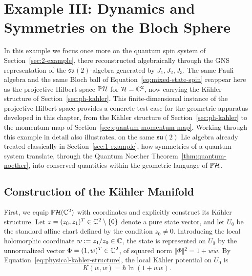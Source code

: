 \section{Example III: Dynamics and Symmetries on the Bloch Sphere}
\label{sec:ex-three}

In this example we focus once more on the quantum spin system of Section~\ref{sec:2-example}, there reconstructed algebraically through the GNS representation of the $\mathfrak{su}(2)$-algebra generated by $J_1,J_2,J_3$. The same Pauli algebra and the same Bloch ball of Equation~\eqref{eq:mixed-state-spin} reappear here as the projective Hilbert space $\PH$ for $\H=\C^2$, now carrying the Kähler structure of Section~\ref{sec:ph-kahler}.
This finite-dimensional instance of the projective Hilbert space provides a concrete test case for the geometric apparatus developed in this chapter, from the Kähler structure of Section~\ref{sec:ph-kahler} to the momentum map of Section~\ref{sec:quantum-momentum-map}. Working through this example in detail also illustrates, on the same $\mathfrak{su}(2)$ Lie algebra already treated classically in Section~\ref{sec:1-example}, how symmetries of a quantum system translate, through the Quantum Noether Theorem~\ref{thm:quantum-noether}, into conserved quantities within the geometric language of $\PH$.


\subsection*{Construction of the Kähler Manifold}

First, we equip $\PH(\C^2)$ with coordinates and explicitly construct its Kähler structure. Let $z = (z_0, z_1)^T \in \mathbb{C}^2 \setminus \{0\}$ denote a pure state vector, and let $U_0$ be the standard affine chart defined by the condition $z_0 \neq 0$. Introducing the local holomorphic coordinate $w := z_1/z_0 \in \mathbb{C}$, the state is represented on $U_0$ by the unnormalized vector $\Phi = (1, w)^T \in \mathbb{C}^2$, of squared norm $\Vert{}\Phi\Vert{}^2 = 1 + w\bar{w}$. By Equation~\eqref{eq:physical-kahler-structure}, the local Kähler potential on $U_0$ is
\begin{equation}
	K(w,\bar w)=\hbar\ln(1+w\bar w). \label{eq:qubit-potential}
\end{equation}

